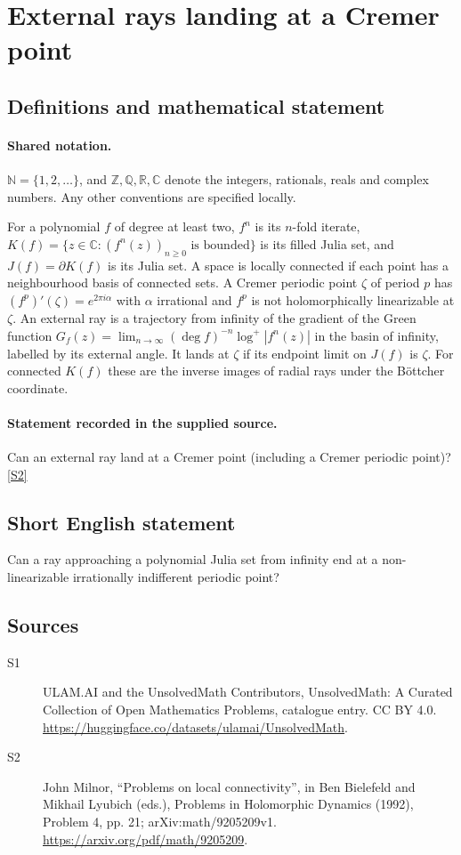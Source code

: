 \documentclass[11pt]{article}
\newcommand{\sref}[2]{\hyperlink{source:#1:#2}{[S#2]}}
\begin{document}
\section{External rays landing at a Cremer point}\label{statement}

\subsection{Definitions and mathematical statement}

\paragraph{Shared notation.}$\mathbb N=\{1,2,\ldots\}$, and $\mathbb Z,\mathbb Q,\mathbb R,\mathbb C$ denote the integers, rationals, reals and complex numbers. Any other conventions are specified locally.


For a polynomial $f$ of degree at least two, $f^n$ is its $n$-fold iterate, $K(f)=\{z\in\mathbb C:(f^n(z))_{n\geq0}\text{ is bounded}\}$ is its filled Julia set, and $J(f)=\partial K(f)$ is its Julia set. A space is locally connected if each point has a neighbourhood basis of connected sets. A Cremer periodic point $\zeta$ of period $p$ has $(f^p)'(\zeta)=e^{2\pi i\alpha}$ with $\alpha$ irrational and $f^p$ is not holomorphically linearizable at $\zeta$. An external ray is a trajectory from infinity of the gradient of the Green function $G_f(z)=\lim_{n\to\infty}(\deg f)^{-n}\log^+|f^n(z)|$ in the basin of infinity, labelled by its external angle. It lands at $\zeta$ if its endpoint limit on $J(f)$ is $\zeta$. For connected $K(f)$ these are the inverse images of radial rays under the Böttcher coordinate.
\paragraph{Statement recorded in the supplied source.}
Can an external ray land at a Cremer point (including a Cremer periodic point)? \sref{statement}{2}
\subsection{Short English statement}
Can a ray approaching a polynomial Julia set from infinity end at a non-linearizable irrationally indifferent periodic point?
\subsection{Sources}
\begin{description}
\item[\hypertarget{source:statement:1}{S1}] ULAM.AI and the UnsolvedMath Contributors, UnsolvedMath: A Curated Collection of Open Mathematics Problems, catalogue entry. CC BY 4.0. \url{https://huggingface.co/datasets/ulamai/UnsolvedMath}.
\item[\hypertarget{source:statement:2}{S2}] John Milnor, ``Problems on local connectivity'', in Ben Bielefeld and Mikhail Lyubich (eds.), Problems in Holomorphic Dynamics (1992), Problem 4, pp. 21; arXiv:math/9205209v1. \url{https://arxiv.org/pdf/math/9205209}.
\end{description}
\label{end:statement}
\end{document}
